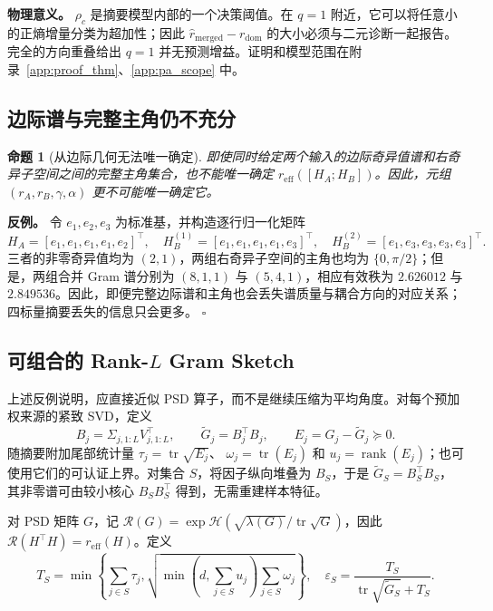 \documentclass{article}
\newcommand{\reff}{\ensuremath{r_{\mathrm{eff}}}\xspace}
\newtheorem{proposition}[lemma]{命题}
\begin{document}
\textbf{物理意义。}
$\rho_c$ 是摘要模型内部的一个决策阈值。在 $q=1$ 附近，它可以将任意小的正熵增量分类为超加性；因此 $\hat r_{\mathrm{merged}}-r_{\mathrm{dom}}$ 的大小必须与二元诊断一起报告。完全的方向重叠给出 $q=1$ 并无预测增益。证明和模型范围在附录~\ref{app:proof_thm}、\ref{app:pa_scope} 中。

\subsection{边际谱与完整主角仍不充分}
\label{sec:insufficiency}

\begin{proposition}[从边际几何无法唯一确定]
\label{prop:insufficient}
即使同时给定两个输入的边际奇异值谱和右奇异子空间之间的完整主角集合，也不能唯一确定 $\reff([H_A;H_B])$。因此，元组 $(r_A,r_B,\gamma,\alpha)$ 更不可能唯一确定它。
\end{proposition}

\textbf{反例。}
令 $e_1,e_2,e_3$ 为标准基，并构造逐行归一化矩阵
\begin{equation}
 H_A=[e_1,e_1,e_1,e_1,e_2]^\top,\quad
 H_B^{(1)}=[e_1,e_1,e_1,e_1,e_3]^\top,\quad
 H_B^{(2)}=[e_1,e_3,e_3,e_3,e_3]^\top.
\end{equation}
三者的非零奇异值均为 $(2,1)$，两组右奇异子空间的主角也均为 $\{0,\pi/2\}$；但是，两组合并 Gram 谱分别为 $(8,1,1)$ 与 $(5,4,1)$，相应有效秩为 $2.626012$ 与 $2.849536$。因此，即便完整边际谱和主角也会丢失谱质量与耦合方向的对应关系；四标量摘要丢失的信息只会更多。
\hfill$\square$

\subsection{可组合的 Rank-$L$ Gram Sketch}
\label{sec:rank_l}

上述反例说明，应直接近似 PSD 算子，而不是继续压缩为平均角度。对每个预加权来源的紧致 SVD，定义
\begin{equation}
 B_j=\Sigma_{j,1:L}V_{j,1:L}^{\top},\qquad
 \widetilde G_j=B_j^\top B_j,\qquad
 E_j=G_j-\widetilde G_j\succeq0 .
 \label{eq:rank_l_sketch}
\end{equation}
随摘要附加尾部统计量
$\tau_j=\operatorname{tr}\sqrt{E_j}$、
$\omega_j=\operatorname{tr}(E_j)$ 和
$u_j=\operatorname{rank}(E_j)$；也可使用它们的可认证上界。对集合 $S$，将因子纵向堆叠为 $B_S$，于是 $\widetilde G_S=B_S^\top B_S$，其非零谱可由较小核心 $B_SB_S^\top$ 得到，无需重建样本特征。

对 PSD 矩阵 $G$，记
$\mathcal R(G)=\exp\mathcal H(\sqrt{\lambda(G)}/\operatorname{tr}\sqrt G)$，因此 $\mathcal R(H^\top H)=\reff(H)$。定义
\begin{equation}
 T_S=\min\!\left\{\sum_{j\in S}\tau_j,
 \sqrt{\min(d,\sum_{j\in S}u_j)\sum_{j\in S}\omega_j}\right\},
 \quad
 \varepsilon_S=\frac{T_S}{\operatorname{tr}\sqrt{\widetilde G_S}+T_S}.
 \label{eq:tail_bound}
\end{equation}
\end{document}
